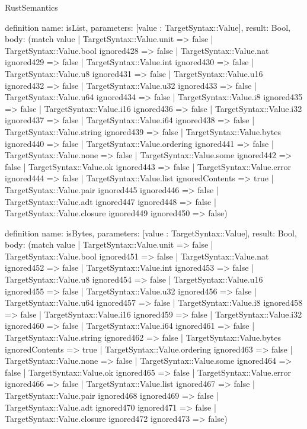 \begin{lexlean}{RustSemantics}
\begin{semanticmodule}
definition{
  name: isList,
  parameters: [value : TargetSyntax::Value],
  result: Bool,
  body: (match value
    | TargetSyntax::Value.unit => false
    | TargetSyntax::Value.bool ignored428 => false
    | TargetSyntax::Value.nat ignored429 => false
    | TargetSyntax::Value.int ignored430 => false
    | TargetSyntax::Value.u8 ignored431 => false
    | TargetSyntax::Value.u16 ignored432 => false
    | TargetSyntax::Value.u32 ignored433 => false
    | TargetSyntax::Value.u64 ignored434 => false
    | TargetSyntax::Value.i8 ignored435 => false
    | TargetSyntax::Value.i16 ignored436 => false
    | TargetSyntax::Value.i32 ignored437 => false
    | TargetSyntax::Value.i64 ignored438 => false
    | TargetSyntax::Value.string ignored439 => false
    | TargetSyntax::Value.bytes ignored440 => false
    | TargetSyntax::Value.ordering ignored441 => false
    | TargetSyntax::Value.none => false
    | TargetSyntax::Value.some ignored442 => false
    | TargetSyntax::Value.ok ignored443 => false
    | TargetSyntax::Value.error ignored444 => false
    | TargetSyntax::Value.list ignoredContents => true
    | TargetSyntax::Value.pair ignored445 ignored446 => false
    | TargetSyntax::Value.adt ignored447 ignored448 => false
    | TargetSyntax::Value.closure ignored449 ignored450 => false)
}

definition{
  name: isBytes,
  parameters: [value : TargetSyntax::Value],
  result: Bool,
  body: (match value
    | TargetSyntax::Value.unit => false
    | TargetSyntax::Value.bool ignored451 => false
    | TargetSyntax::Value.nat ignored452 => false
    | TargetSyntax::Value.int ignored453 => false
    | TargetSyntax::Value.u8 ignored454 => false
    | TargetSyntax::Value.u16 ignored455 => false
    | TargetSyntax::Value.u32 ignored456 => false
    | TargetSyntax::Value.u64 ignored457 => false
    | TargetSyntax::Value.i8 ignored458 => false
    | TargetSyntax::Value.i16 ignored459 => false
    | TargetSyntax::Value.i32 ignored460 => false
    | TargetSyntax::Value.i64 ignored461 => false
    | TargetSyntax::Value.string ignored462 => false
    | TargetSyntax::Value.bytes ignoredContents => true
    | TargetSyntax::Value.ordering ignored463 => false
    | TargetSyntax::Value.none => false
    | TargetSyntax::Value.some ignored464 => false
    | TargetSyntax::Value.ok ignored465 => false
    | TargetSyntax::Value.error ignored466 => false
    | TargetSyntax::Value.list ignored467 => false
    | TargetSyntax::Value.pair ignored468 ignored469 => false
    | TargetSyntax::Value.adt ignored470 ignored471 => false
    | TargetSyntax::Value.closure ignored472 ignored473 => false)
}


\end{semanticmodule}
\end{lexlean}
